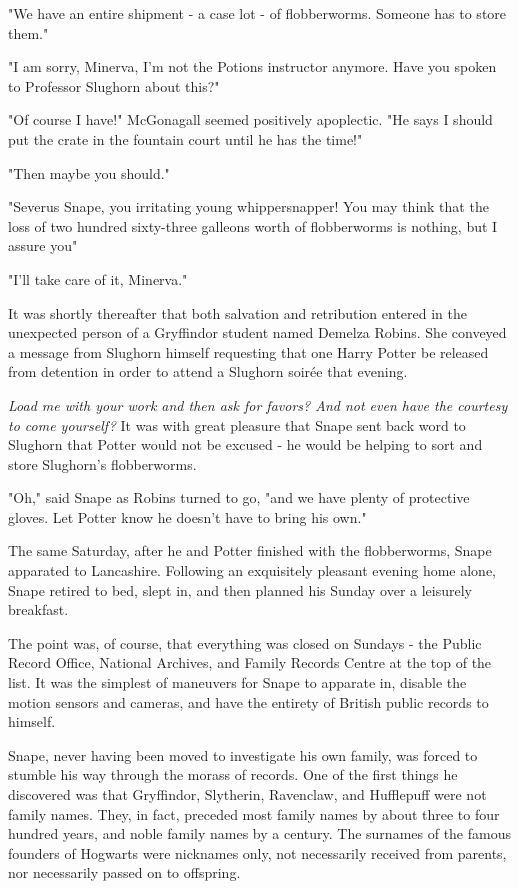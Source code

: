 "We have an entire shipment - a case lot - of flobberworms. Someone has to store them."

"I am sorry, Minerva, I'm not the Potions instructor anymore. Have you spoken to Professor Slughorn about this?"

"Of course I have!" McGonagall seemed positively apoplectic. "He says I should put the crate in the fountain court until he has the time!"

"Then maybe you should."

"Severus Snape, you irritating young whippersnapper! You may think that the loss of two hundred sixty-three galleons worth of flobberworms is nothing, but I assure you{\el}"

"I'll take care of it, Minerva."

It was shortly thereafter that both salvation and retribution entered in the unexpected person of a Gryffindor student named Demelza Robins. She conveyed a message from Slughorn himself requesting that one Harry Potter be released from detention in order to attend a Slughorn soirée that evening.

\emph{Load me with your work and then ask for favors? And not even have the courtesy to come yourself?} It was with great pleasure that Snape sent back word to Slughorn that Potter would not be excused - he would be helping to sort and store Slughorn's flobberworms.

"Oh," said Snape as Robins turned to go, "and we have plenty of protective gloves. Let Potter know he doesn't have to bring his own."

The same Saturday, after he and Potter finished with the flobberworms, Snape apparated to Lancashire. Following an exquisitely pleasant evening home alone, Snape retired to bed, slept in, and then planned his Sunday over a leisurely breakfast.

The point was, of course, that everything was closed on Sundays - the Public Record Office, National Archives, and Family Records Centre at the top of the list. It was the simplest of maneuvers for Snape to apparate in, disable the motion sensors and cameras, and have the entirety of British public records to himself.

Snape, never having been moved to investigate his own family, was forced to stumble his way through the morass of records. One of the first things he discovered was that Gryffindor, Slytherin, Ravenclaw, and Hufflepuff were not family names. They, in fact, preceded most family names by about three to four hundred years, and noble family names by a century. The surnames of the famous founders of Hogwarts were nicknames only, not necessarily received from parents, nor necessarily passed on to offspring.

